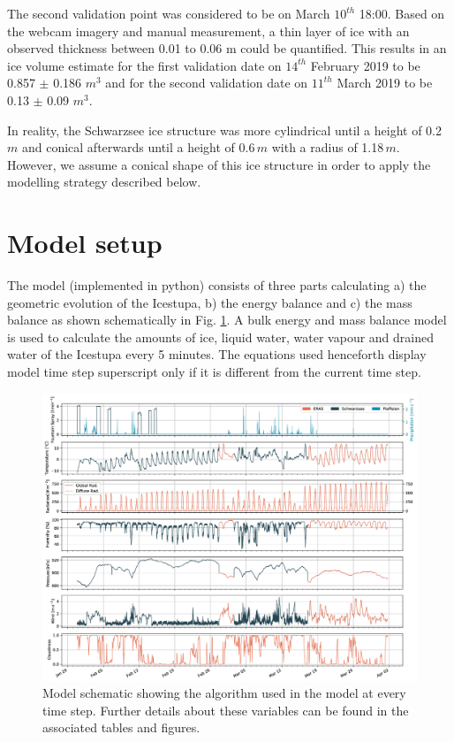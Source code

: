 \documentclass[utf8]{frontiersSCNS} %
\begin{document}
The second validation point was considered to be on March $10^{th}$ 18:00.  Based on the webcam imagery and manual
measurement, a thin layer of ice with an observed thickness between 0.01 to 0.06 m could be quantified. This results in
an ice volume estimate for the first validation date on $14^{th}$ February 2019 to be 0.857 $\pm$ 0.186 $m^{3}$ and for
the second validation date on $11^{th}$ March 2019 to be 0.13 $\pm$ 0.09 $m^{3}$.

In reality, the Schwarzsee ice structure was more cylindrical until a height of 0.2\,$m$ and conical afterwards until a
height of 0.6\,$m$ with a radius of 1.18\,$m$. However, we assume a conical shape of this ice structure in order to
apply the modelling strategy described below.

\section{Model setup}

The model (implemented in python) consists of three parts calculating a) the geometric evolution of the Icestupa, b)
the energy balance and c) the mass balance as shown schematically in Fig. \ref{fig:schema}. A bulk energy and mass
balance model is used to calculate the amounts of ice, liquid water, water vapour and drained water of the Icestupa
every 5 minutes. The equations used henceforth display model time step superscript only if it is different from the
current time step.

  \begin{figure} \begin{center} \includegraphics[width=15 cm]{Figures/Figure_4.jpg} \end{center} \caption{Model
schematic showing the algorithm used in the model at every time step. Further details about these variables can be
found in the associated tables and figures.} \label{fig:schema} \end{figure}
\end{document}

